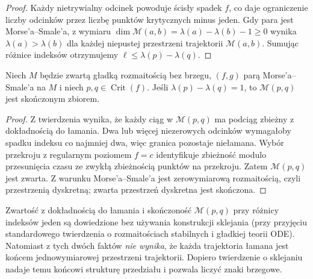 \begin{proof}
Każdy nietrywialny odcinek powoduje ścisły spadek $f$,
co daje ograniczenie liczby odcinków przez liczbę
punktów krytycznych minus jeden.
Gdy para jest Morse'a--Smale'a, z wymiaru
$\dim\mathcal M(a,b)=\lambda(a)-\lambda(b)-1\ge0$
wynika $\lambda(a)>\lambda(b)$ dla każdej niepustej
przestrzeni trajektorii $\mathcal M(a,b)$.
Sumując różnice indeksów otrzymujemy
$\ell\le\lambda(p)-\lambda(q)$.
\end{proof}

\begin{wniosek}
\label{cor:morse-rigid-finite-v11}
Niech $M$ będzie zwartą gładką rozmaitością bez brzegu,
$(f,g)$ parą Morse'a--Smale'a na $M$ i niech
$p,q\in\operatorname{Crit}(f)$.
Jeśli $\lambda(p)-\lambda(q)=1$, to
$\mathcal M(p,q)$ jest skończonym zbiorem.
\end{wniosek}
\begin{proof}
Z twierdzenia wynika, że każdy ciąg w $\mathcal M(p,q)$
ma podciąg zbieżny z dokładnością do łamania.
Dwa lub więcej niezerowych odcinków wymagałoby spadku indeksu
co najmniej dwa, więc granica pozostaje niełamana.
Wybór przekroju z regularnym poziomem $f=c$ identyfikuje
zbieżność modulo przesunięcia czasu ze zwykłą zbieżnością
punktów na przekroju. Zatem $\mathcal M(p,q)$ jest zwarta.
Z warunku Morse'a--Smale'a jest zerowymiarową rozmaitością,
czyli przestrzenią dyskretną; zwarta przestrzeń dyskretna
jest skończona.
\end{proof}

\begin{uwaga}
Zwartość z dokładnością do łamania i skończoność
$\mathcal M(p,q)$ przy różnicy indeksów jeden są dowiedzione
bez używania konstrukcji sklejania (przy przyjęciu
standardowego twierdzenia o rozmaitościach stabilnych
i gładkiej teorii ODE). Natomiast z tych dwóch
faktów \emph{nie wynika}, że każda trajektoria łamana
jest końcem jednowymiarowej przestrzeni trajektorii.
Dopiero twierdzenie o sklejaniu nadaje temu końcowi
strukturę przedziału i pozwala liczyć znaki brzegowe.
\end{uwaga}

